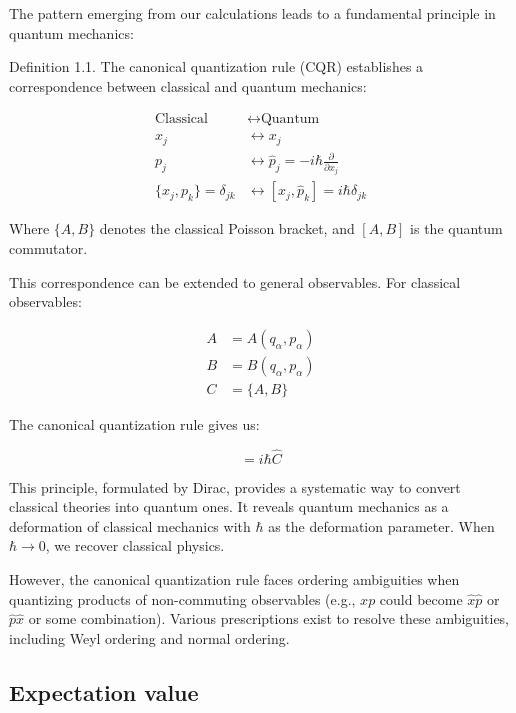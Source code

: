 \documentclass[italian]{HKNdocument}
\begin{document}
The pattern emerging from our calculations leads to a fundamental principle in quantum mechanics:

Definition 1.1. The canonical quantization rule (CQR) establishes a correspondence between classical and quantum mechanics:

\begin{align}
\text{Classical} &\longleftrightarrow \text{Quantum} \\
x_j &\longleftrightarrow x_j \\
p_j &\longleftrightarrow \hat{p}_j = -i\hbar\frac{\partial}{\partial x_j} \label{eq:1.75} \\
\{x_j, p_k\} = \delta_{jk} &\longleftrightarrow [x_j, \hat{p}_k] = i\hbar\delta_{jk}
\end{align}

Where $\{A,B\}$ denotes the classical Poisson bracket, and $[A,B]$ is the quantum commutator.

This correspondence can be extended to general observables. For classical observables:

\begin{align}
A &= A(q_\alpha, p_\alpha) \\
B &= B(q_\alpha, p_\alpha) \label{eq:1.76} \\
C &= \{A, B\}
\end{align}

The canonical quantization rule gives us:

\begin{equation}
[\hat{A}, \hat{B}] = i\hbar\hat{C} \label{eq:1.77}
\end{equation}

This principle, formulated by Dirac, provides a systematic way to convert classical theories into quantum ones. It reveals quantum mechanics as a deformation of classical mechanics with $\hbar$ as the deformation parameter. When $\hbar \to 0$, we recover classical physics.

However, the canonical quantization rule faces ordering ambiguities when quantizing products of non-commuting observables (e.g., $xp$ could become $\hat{x}\hat{p}$ or $\hat{p}\hat{x}$ or some combination). Various prescriptions exist to resolve these ambiguities, including Weyl ordering and normal ordering.

\subsection{Expectation value}
\end{document}
